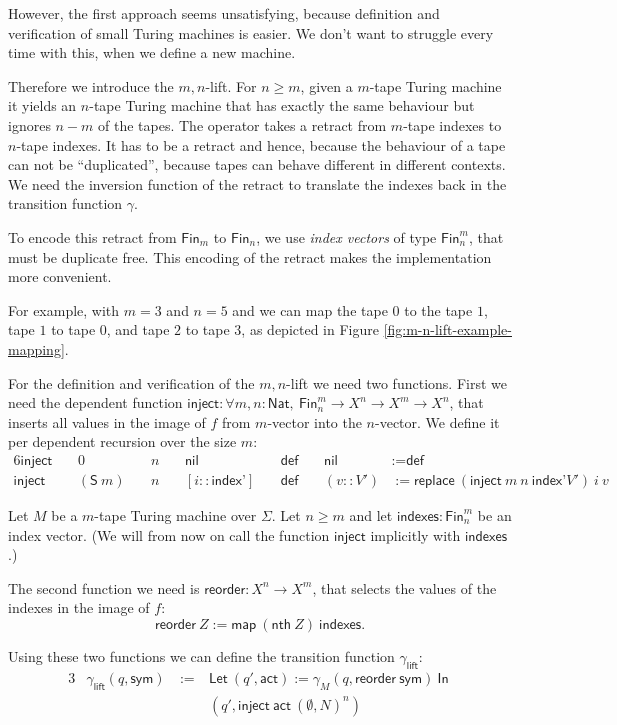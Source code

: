 \documentclass{psartcl}
\newcommand{\MS}[1]{\textsf{#1}}
\newcommand{\nil}{\MS{nil}}
\newcommand{\from}{:}
\renewcommand{\to}{\rightarrow}
\newcommand{\Fin}{\MS{Fin}}
\newcommand{\Nat}{\MS{Nat}}
\renewcommand{\None}{\emptyset}
\newcommand{\mlet}[2]{\MS{Let}~#1~\MS{In}~#2}
\begin{document}
However, the first approach seems unsatisfying, because definition and verification of small Turing machines is easier.  We don't want to struggle
every time with this, when we define a new machine.

Therefore we introduce the $m,n$-lift. For $n \ge m$, given a $m$-tape Turing machine it yields an $n$-tape Turing machine that has exactly the
same behaviour but ignores $n-m$ of the tapes.  The operator takes a retract from $m$-tape indexes to $n$-tape indexes.  It has to be a retract and
hence, because the behaviour of a tape can not be ``duplicated'', because tapes can behave different in different contexts.  We need the inversion
function of the retract to translate the indexes back in the transition function $\gamma$.

To encode this retract from $\Fin_m$ to $\Fin_n$, we use \emph{index vectors} of type $\Fin_n^m$, that must be duplicate free.  This encoding of the retract makes the implementation more convenient.

For example, with $m=3$ and $n=5$ and we can  map the tape $0$ to the tape $1$, tape $1$ to tape $0$, and tape $2$ to tape $3$, as depicted in Figure
\ref{fig:m-n-lift-example-mapping}.

For the definition and verification of the $m,n$-lift we need two functions.
First we need the dependent function
$\MS{inject} \from \forall m, n:\Nat,~\Fin_n^m \to X^n \to X^m \to X^n$,
that inserts all values in the image of $f$ from $m$-vector into the $n$-vector.  We define it per dependent recursion over the size $m$:
\begin{alignat*}{6}
  \MS{inject}&&~ 0         && ~ n &&~ \nil                &&~ \MS{def} &&~ \nil      &:= \MS{def} \\
  \MS{inject}&&~ (\MS S~m) && ~ n &&~ [i :: \MS{index'}]  &&~ \MS{def} &&~ (v :: V') &:= \MS{replace}~(\MS{inject}~m~n~\MS{index'} V')~i~v
\end{alignat*}

Let $M$ be a $m$-tape Turing machine over $\Sigma$.  Let $n \ge m$ and let $\MS{indexes}:\Fin_n^m$ be an index vector.
(We will from now on call the function $\MS{inject}$ implicitly with $\MS{indexes}$.)

The second function we need is $\MS{reorder} \from X^n \to X^m$, that selects the values of the indexes in the image of $f$:
$$\MS{reorder}~Z := \MS{map}~(\MS{nth}~Z)~\MS{indexes}.$$

Using these two functions we can define the transition function $\gamma_{\MS{lift}}$:
\begin{alignat*}{3}
  &\gamma_{\MS{lift}} (q, \MS{sym})  &~:=~& \mlet {(q', \MS{act}) := \gamma_M(q, \MS{reorder}~\MS{sym})}{\\
  &                                  &~  ~& (q',\MS{inject}~\MS{act}~(\None, N)^n)}
\end{alignat*}
\end{document}
